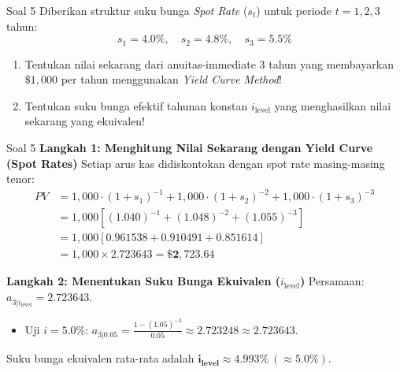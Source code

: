 \documentclass[11pt,a4paper]{article}
\begin{document}
\vspace{1.5em}

\begin{problembox}{Soal 5}
Diberikan struktur suku bunga \textit{Spot Rate} ($s_t$) untuk periode $t = 1, 2, 3$ tahun:
\begin{equation*}
    s_1 = 4.0\%, \quad s_2 = 4.8\%, \quad s_3 = 5.5\%
\end{equation*}
\begin{enumerate}[label=(\alph*)]
    \item Tentukan nilai sekarang dari anuitas-immediate 3 tahun yang membayarkan $\$1{,}000$ per tahun menggunakan \textit{Yield Curve Method}!
    \item Tentukan suku bunga efektif tahunan konstan $i_{\text{level}}$ yang menghasilkan nilai sekarang yang ekuivalen!
\end{enumerate}
\end{problembox}

\begin{solutionbox}{Soal 5}
\textbf{Langkah 1: Menghitung Nilai Sekarang dengan Yield Curve (Spot Rates)}
Setiap arus kas didiskontokan dengan spot rate masing-masing tenor:
\begin{align*}
    PV &= 1{,}000 \cdot (1 + s_1)^{-1} + 1{,}000 \cdot (1 + s_2)^{-2} + 1{,}000 \cdot (1 + s_3)^{-3} \\[0.4em]
       &= 1{,}000 \left[ (1.040)^{-1} + (1.048)^{-2} + (1.055)^{-3} \right] \\[0.4em]
       &= 1{,}000 \left[ 0.961538 + 0.910491 + 0.851614 \right] \\[0.4em]
       &= 1{,}000 \times 2.723643 = \mathbf{\$2{,}723.64}
\end{align*}

\textbf{Langkah 2: Menentukan Suku Bunga Ekuivalen ($i_{\text{level}}$)}
Persamaan: $a_{\overline{3}|i_{\text{level}}} = 2.723643$.
\begin{itemize}
    \item Uji $i = 5.0\%$: $a_{\overline{3}|0.05} = \frac{1 - (1.05)^{-3}}{0.05} \approx 2.723248 \approx 2.723643$.
\end{itemize}
Suku bunga ekuivalen rata-rata adalah $\mathbf{i_{\text{level}} \approx 4.993\% \ (\approx 5.0\%)}$.
\end{solutionbox}

\vspace{1.5em}
\end{document}

